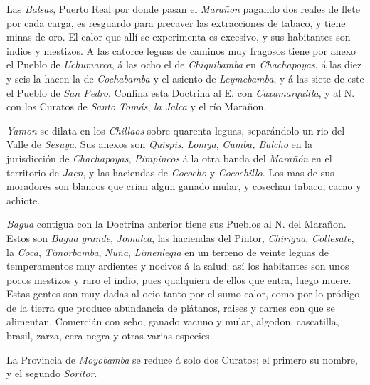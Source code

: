 \documentclass[12pt,a4paper]{article}
\begin{document}
Las \emph{Balsas}, Puerto Real por donde pasan el \emph{Marañon} pagando dos reales de flete por cada carga, es resguardo para precaver las extracciones de tabaco, y tiene minas de oro. El calor que allí se experimenta es excesivo, y sus habitantes son indios y mestizos. A las catorce leguas de caminos muy fragosos tiene por anexo el Pueblo de \emph{Uchumarca}, á las ocho el de \emph{Chiquibamba} en \emph{Chachapoyas}, á las diez y seis la hacen la de \emph{Cochabamba} y el asiento de \emph{Leymebamba}, y á las siete de este el Pueblo de \emph{San Pedro}. Confina esta Doctrina al E. con \emph{Caxamarquilla}, y al N. con los Curatos de \emph{Santo Tomás}, \emph{la Jalca} y el río Marañon.

 \emph{Yamon} se dilata en los \emph{Chillaos} sobre quarenta leguas, separándolo un rio del Valle de \emph{Sesuya}. Sus anexos son \emph{Quispis}. \emph{Lomya}, \emph{Cumba, Balcho} en la jurisdicción de  \emph{Chachapoyas}, \emph{Pimpincos} á la otra banda del \emph{Marañón} en el territorio de \emph{Jaen}, y las haciendas de \emph{Cococho} y \emph{Cocochillo}. Los mas de sus moradores son blancos que crian algun ganado mular, y cosechan tabaco, cacao y achiote.

\emph{Bagua} contigua con la Doctrina anterior tiene sus Pueblos al N. del Marañon. Estos son \emph{Bagua grande}, \emph{Jomalca}, las haciendas del Pintor, \emph{Chirigua}, \emph{Collesate}, la \emph{Coca}, \emph{Timorbamba}, \emph{Nuña}, \emph{Limenlegia} en un terreno de veinte leguas de temperamentos muy ardientes y nocivos á la salud: así los habitantes son unos pocos mestizos y raro el indio, pues qualquiera de ellos que entra, luego muere. Estas gentes son muy dadas al ocio tanto por el sumo calor, como por lo pródigo de la tierra que produce abundancia de plátanos, raises y carnes con que se alimentan. Comercián con sebo, ganado vacuno y mular, algodon, cascatilla, brasil, zarza, cera negra y otras varias especies.

La Provincia de \emph{Moyobamba} se reduce á solo dos Curatos; el primero su nombre, y el segundo \emph{Soritor}.
\end{document}
